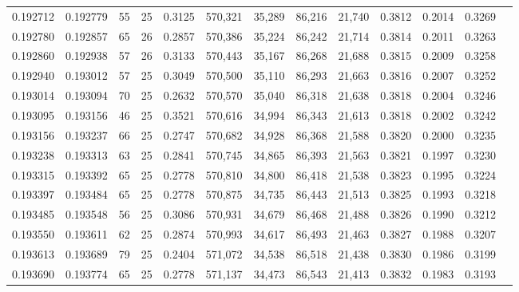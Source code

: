 \begin{tabular}{rrrrrrrrrrrrr}
0.192712 & 0.192779 &  55 &  25 &                                     0.3125 & 570,321 &  35,289 &  86,216 &  21,740 & 0.3812 & 0.2014 & 0.3269 \\
0.192780 & 0.192857 &  65 &  26 &                                     0.2857 & 570,386 &  35,224 &  86,242 &  21,714 & 0.3814 & 0.2011 & 0.3263 \\
0.192860 & 0.192938 &  57 &  26 &                                     0.3133 & 570,443 &  35,167 &  86,268 &  21,688 & 0.3815 & 0.2009 & 0.3258 \\
0.192940 & 0.193012 &  57 &  25 &                                     0.3049 & 570,500 &  35,110 &  86,293 &  21,663 & 0.3816 & 0.2007 & 0.3252 \\
0.193014 & 0.193094 &  70 &  25 &                                     0.2632 & 570,570 &  35,040 &  86,318 &  21,638 & 0.3818 & 0.2004 & 0.3246 \\
0.193095 & 0.193156 &  46 &  25 &                                     0.3521 & 570,616 &  34,994 &  86,343 &  21,613 & 0.3818 & 0.2002 & 0.3242 \\
0.193156 & 0.193237 &  66 &  25 &                                     0.2747 & 570,682 &  34,928 &  86,368 &  21,588 & 0.3820 & 0.2000 & 0.3235 \\
0.193238 & 0.193313 &  63 &  25 &                                     0.2841 & 570,745 &  34,865 &  86,393 &  21,563 & 0.3821 & 0.1997 & 0.3230 \\
0.193315 & 0.193392 &  65 &  25 &                                     0.2778 & 570,810 &  34,800 &  86,418 &  21,538 & 0.3823 & 0.1995 & 0.3224 \\
0.193397 & 0.193484 &  65 &  25 &                                     0.2778 & 570,875 &  34,735 &  86,443 &  21,513 & 0.3825 & 0.1993 & 0.3218 \\
0.193485 & 0.193548 &  56 &  25 &                                     0.3086 & 570,931 &  34,679 &  86,468 &  21,488 & 0.3826 & 0.1990 & 0.3212 \\
0.193550 & 0.193611 &  62 &  25 &                                     0.2874 & 570,993 &  34,617 &  86,493 &  21,463 & 0.3827 & 0.1988 & 0.3207 \\
0.193613 & 0.193689 &  79 &  25 &                                     0.2404 & 571,072 &  34,538 &  86,518 &  21,438 & 0.3830 & 0.1986 & 0.3199 \\
0.193690 & 0.193774 &  65 &  25 &                                     0.2778 & 571,137 &  34,473 &  86,543 &  21,413 & 0.3832 & 0.1983 & 0.3193 \\

\end{tabular}
